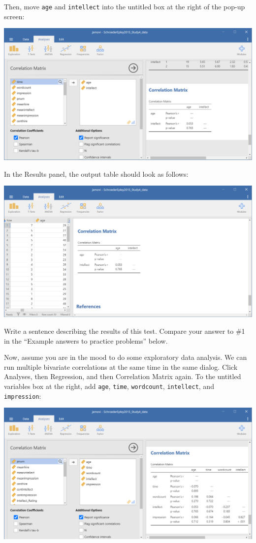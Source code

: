 \documentclass[
]{book}
\begin{document}
Then, move \texttt{age} and \texttt{intellect} into the untitled box at the right of the pop-up screen:

\includegraphics{img/7.4.62.png}

In the Results panel, the output table should look as follows:

\includegraphics{img/7.4.63.png}

Write a sentence describing the results of this test. Compare your answer to \#1 in the ``Example answers to practice problems'' below.

Now, assume you are in the mood to do some exploratory data analysis. We can run multiple bivariate correlations at the same time in the same dialog. Click {Analyses}, then {Regression}, and then {Correlation Matrix} again. To the untitled variables box at the right, add \texttt{age}, \texttt{time}, \texttt{wordcount}, \texttt{intellect}, and \texttt{impression}:

\includegraphics{img/7.4.64.png}
\end{document}
